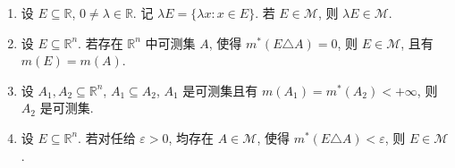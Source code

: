 \documentclass[../../main.tex]{subfiles}%
\begin{document}
\begin{proposition}\label{proposition:可测集的一些性质111}
\begin{enumerate}[(1)]
\item 设 $E\subseteq\mathbb{R}$, $0\neq\lambda\in\mathbb{R}$. 记 $\lambda E=\{\lambda x: x\in E\}$. 若 $E\in\mathscr{M} $, 则 $\lambda E\in\mathscr{M} $.

\item\label{proposition:可测集的一些性质111-2} 设 $E\subseteq\mathbb{R}^n$. 若存在 $\mathbb{R}^n$ 中可测集 $A$, 使得 $m^*(E\triangle A)=0$, 则 $E\in\mathscr{M} $, 且有 $m(E)=m(A)$.

\item 设 $A_1,A_2\subseteq\mathbb{R}^n$, $A_1\subseteq A_2$, $A_1$ 是可测集且有 $m(A_1)=m^*(A_2)<+\infty$, 则 $A_2$ 是可测集.

\item 设 $E\subseteq\mathbb{R}^n$. 若对任给 $\varepsilon>0$, 均存在 $A\in\mathscr{M} $, 使得 $m^*(E\triangle A)<\varepsilon$, 则 $E\in\mathscr{M} $.
\end{enumerate}
\end{proposition}
\end{document}
